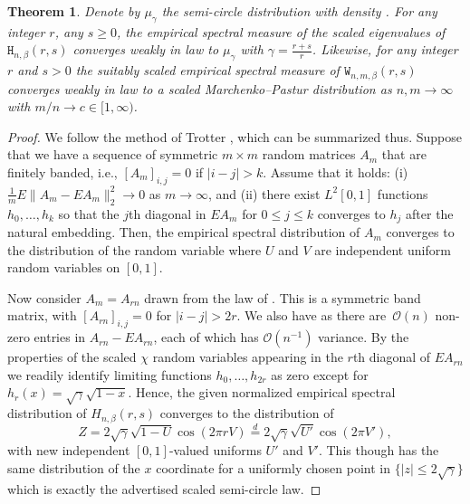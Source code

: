 \documentclass[pdftex]{sigma}
\numberwithin{equation}{section}
\newtheorem{Theorem}{Theorem}[section]
\theoremstyle{definition}
\newcommand{\HH}{\mathtt{H}_{n,\beta}}
\newcommand{\WW}{\mathtt{W}_{n,m, \beta}}
\begin{document}
\begin{Theorem}\label{thm:eigcount}
Denote by $\mu_\gamma$ the semi-circle distribution with density . For any integer $r$, any $s\ge 0$, the empirical spectral measure  of the scaled eigenvalues of $\HH(r,s)$
converges weakly in law to $\mu_\gamma$ with $\gamma = \frac{r+s}{r}$. Likewise, for any integer $r$ and $s>0$ the suitably scaled empirical spectral measure of $\WW(r,s)$ converges weakly in law to
a scaled Marchenko--Pastur distribution as $n,m \rightarrow \infty$ with $m/n \rightarrow c \in [1, \infty)$.
\end{Theorem}

\begin{proof}
We follow the method of Trotter \cite{Trotter}, which
can be summarized thus.
Suppose that we have a sequence of symmetric $m\times m$ random matrices $A_m$ that are finitely banded, i.e., $[A_m]_{i,j}=0$ if $|i-j|>k$. Assume that it holds:
(i) $\frac1m E\|A_m-E A_m\|^2_2\to 0$ as $m \to \infty$, and (ii)
there exist $L^2[0,1]$ functions $h_0, \dots, h_k$ so that the $j$th diagonal in $EA_m$ for $0\le j\le k$ converges to $h_j$
after the natural embedding.
Then, the empirical spectral distribution of $A_m$ converges to the distribution of the random variable  where $U$ and $V$
are independent uniform random variables on $[0,1]$.

Now consider $A_m = A_{rn}$ drawn from the law of \smash{$ \frac{1}
{\sqrt{rn}} \HH(r,s) $}. This is a symmetric band matrix, with $[A_{rn}]_{i,j}=0$ for $|i-j|> 2r$. We also have  as there are~$\mathcal{O}(n)$ non-zero entries in $A_{rn}-EA_{rn}$, each of which has $\mathcal{O}(n^{-1})$ variance. By the properties of the scaled $\chi$
random variables appearing in the $r$th diagonal of $EA_{rn}$ we readily identify limiting functions $h_0, \dots, h_{2r}$ as zero except for
$
h_r(x)=\sqrt{\gamma}\sqrt{1-x}.
$
Hence, the given normalized empirical spectral distribution of $H_{n, \beta}{(r,s)}$ converges to the distribution of
\[Z =2 \sqrt{\gamma}\sqrt{1-U} \cos(2\pi r V) \stackrel{d}{=}
 2 \sqrt{\gamma}\sqrt{U'} \cos(2\pi V'),
\]
with new independent $[0,1]$-valued uniforms $U'$ and $V'$.
This though has the same distribution of the $x$ coordinate for a uniformly chosen point in $\{|z| \le 2 \sqrt{\gamma}\}$ which is exactly the advertised scaled semi-circle law.


\end{proof}
\end{document}
